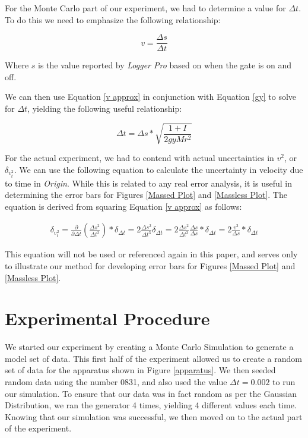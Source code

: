 \documentclass[12pt]{article}
\begin{document}
\indent For the Monte Carlo part of our experiment, we had to determine a value for $\Delta t$. To do this we need to emphasize the following relationship:

\begin{equation}
    v=\frac{\Delta s}{\Delta t} \label{v approx}
\end{equation}

\noindent Where $s$ is the value reported by \textit{Logger Pro} based on when the gate is on and off. \par
\indent We can then use Equation \ref{v approx} in conjunction with Equation \ref{gy} to solve for $\Delta t$, yielding the following useful relationship:

\begin{equation}
    \Delta t = \Delta s*\sqrt{\frac{1+I}{2gyMr^2}} \label{dtr}
\end{equation}

\indent For the actual experiment, we had to contend with actual uncertainties in $v^2$, or $\delta_{v^2_t}$. We can use the following equation to calculate the uncertainty in velocity due to time in \textit{Origin}. While this is related to any real error analysis, it is useful in determining the error bars for Figures \ref{Massed Plot} and \ref{Massless Plot}. The equation is derived from squaring Equation \ref{v approx} as follows:

\begin{equation}
    \begin{split}
        \delta_{v^2_t}=\frac{\partial}{\partial \Delta t}(\frac{\Delta s^2}{\Delta t^2})*\delta_{\Delta t} = 2\frac{\Delta s^2}{\Delta t^3}\delta_{\Delta t}=2\frac{\Delta s^2}{\Delta t^3}\frac{\Delta s}{\Delta s}*\delta_{\Delta t}=2\frac{v^3}{\Delta s}*\delta_{\Delta t}
    \end{split}
\end{equation}

\noindent This equation will not be used or referenced again in this paper, and serves only to illustrate our method for developing error bars for Figures \ref{Massed Plot} and \ref{Massless Plot}.

\section{Experimental Procedure}
We started our experiment by creating a Monte Carlo Simulation to generate a model set of data. This first half of the experiment allowed us to create a random set of data for the apparatus shown in Figure \ref{apparatus}. We then seeded random data using the number 0831, and also used the value $\Delta t=0.002$ to run our simulation. To ensure that our data was in fact random as per the Gaussian Distribution, we ran the generator 4 times, yielding 4 different values each time. Knowing that our simulation was successful, we then moved on to the actual part of the experiment. \par
\end{document}
